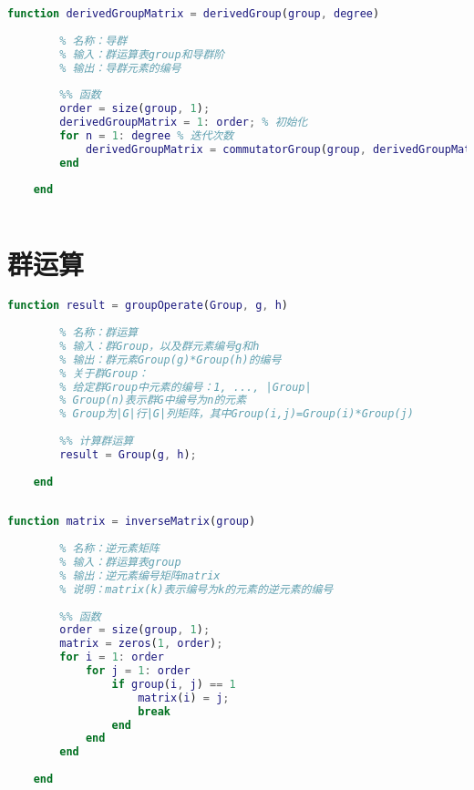 \begin{lstlisting}[language=Matlab, caption={导群}, label={derivedGroup}]
	function derivedGroupMatrix = derivedGroup(group, degree)
	
	    % 名称：导群
	    % 输入：群运算表group和导群阶
	    % 输出：导群元素的编号
	
	    %% 函数
	    order = size(group, 1);
	    derivedGroupMatrix = 1: order; % 初始化
	    for n = 1: degree % 迭代次数
	        derivedGroupMatrix = commutatorGroup(group, derivedGroupMatrix);
	    end
	    
	end
	
\end{lstlisting}

\section{群运算}

\begin{lstlisting}[language=Matlab, caption={群运算}, label={groupOperate}]
	function result = groupOperate(Group, g, h)
	    
	    % 名称：群运算
	    % 输入：群Group，以及群元素编号g和h
	    % 输出：群元素Group(g)*Group(h)的编号
	    % 关于群Group：
	    % 给定群Group中元素的编号：1, ..., |Group|
	    % Group(n)表示群G中编号为n的元素
	    % Group为|G|行|G|列矩阵，其中Group(i,j)=Group(i)*Group(j)
	
	    %% 计算群运算
	    result = Group(g, h);
	
	end
	
\end{lstlisting}

\begin{lstlisting}[language=Matlab, caption={逆元素矩阵}, label={inverseMatrix}]
	function matrix = inverseMatrix(group)
	
	    % 名称：逆元素矩阵
	    % 输入：群运算表group
	    % 输出：逆元素编号矩阵matrix
	    % 说明：matrix(k)表示编号为k的元素的逆元素的编号
	
	    %% 函数
	    order = size(group, 1);
	    matrix = zeros(1, order);
	    for i = 1: order
	        for j = 1: order
	            if group(i, j) == 1
	                matrix(i) = j;
	                break
	            end
	        end
	    end
	
	end
	
\end{lstlisting}

